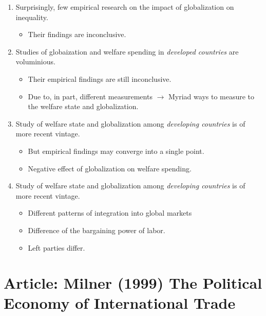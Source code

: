 \documentclass[
]{book}
\providecommand{\tightlist}{%
  \setlength{\itemsep}{0pt}\setlength{\parskip}{0pt}}
\begin{document}
\begin{enumerate}
\def\labelenumi{\arabic{enumi}.}
\item
  Surprisingly, few empirical research on the impact of globalization on inequality.

  \begin{itemize}
  \tightlist
  \item
    Their findings are inconclusive.
  \end{itemize}
\item
  Studies of globaization and welfare spending in \emph{developed countries} are voluminious.

  \begin{itemize}
  \item
    Their empirical findings are still inconclusive.
  \item
    Due to, in part, different measurements \(\rightarrow\) Myriad ways to measure to the welfare state and globalization.
  \end{itemize}
\item
  Study of welfare state and globalization among \emph{developing countries} is of more recent vintage.

  \begin{itemize}
  \item
    But empirical findings may converge into a single point.
  \item
    Negative effect of globalization on welfare spending.
  \end{itemize}
\item
  Study of welfare state and globalization among \emph{developing countries} is of more recent vintage.

  \begin{itemize}
  \item
    Different patterns of integration into global markets
  \item
    Difference of the bargaining power of labor.
  \item
    Left parties differ.
  \end{itemize}
\end{enumerate}

\hypertarget{article-milner-1999-the-political-economy-of-international-trade}{%
\section{Article: Milner (1999) The Political Economy of International Trade}\label{article-milner-1999-the-political-economy-of-international-trade}}
\end{document}
